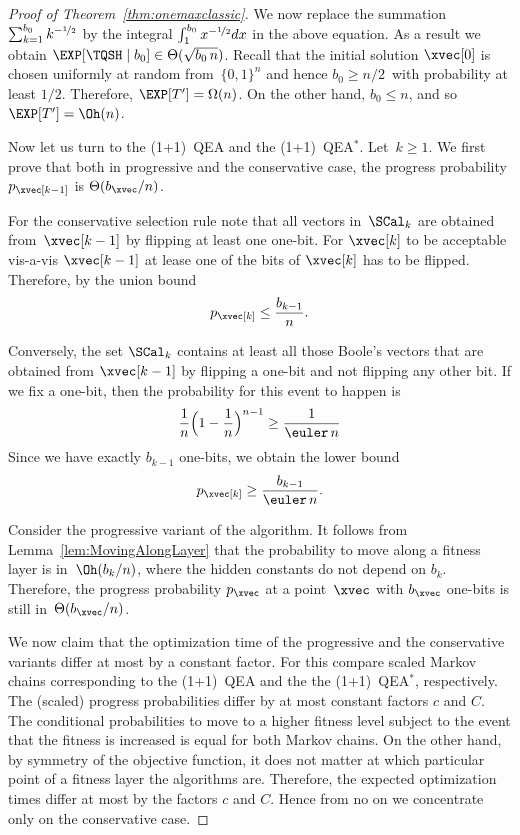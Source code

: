 \begin{proof}[Proof of Theorem~\ref{thm:onemaxclassic}]
  We now replace the summation $\sum_{k=1}^{b_0}k^{-\nicefrac{1}{2}}$
  by the integral $\int_1^{b_0}x^{-\nicefrac{1}{2}}dx$ in the above
  equation. As a result we obtain $\EXP[\TQSH\mid
  b_0]\in\Theta(\sqrt{b_0\,n})$.  Recall that the initial solution
  $\xvec[0]$ is chosen uniformly at random from~$\{0,1\}^n$ and hence
  $b_0\geq n/2$~with probability at least $1/2$. Therefore, $\EXP[T']
  = \Omega(n)$. On the other hand, $b_0 \le n$, and so $\EXP[T'] =
  \Oh(n)$.


  Now let us turn to the (1+1)~QEA and the (1+1)~QEA$^*$. Let~$k\ge
  1$. We first prove that both in progressive and the conservative
  case, the progress probability $p_{\xvec[k-1]}$ is
  $\Theta(b_{\xvec}/n)$.

  For the conservative selection rule note that all vectors
  in~$\SCal_k$ are obtained from~$\xvec[k-1]$ by flipping at least one
  one-bit. For $\xvec[k]$ to be acceptable vis-a-vis $\xvec[k-1]$ at
  lease one of the bits of $\xvec[k]$ has to be flipped. Therefore, by
  the union bound
  \[ p_{\xvec[k]}\le\frac{ b_{k-1}}{n}.\]

  Conversely, the set $\SCal_k$ contains at least all those Boole's
  vectors that are obtained from $\xvec[k-1]$ by flipping a one-bit
  and not flipping any other bit. If we fix a one-bit, then the
  probability for this event to happen is
  \[
  \frac{1}{n}\Big(1-\frac{1}{n}\Big)^{n-1} \geq \frac{1}{\euler\,n}
  \]
  Since we have exactly $b_{k-1}$ one-bits, we obtain the lower bound
  \[
  p_{\xvec[k]}\ge\frac{b_{k-1}}{\euler\,n}.
  \]
  
  Consider the progressive variant of the algorithm. It follows from
  Lemma~\ref{lem:MovingAlongLayer} that the probability to move along
  a fitness layer is in~$\Oh(b_k/n)$, where the hidden constants do
  not depend on $b_k$. Therefore, the progress probability $p_{\xvec}$
  at a point~$\xvec$ with $b_{\xvec}$ one-bits is still
  in~$\Theta(b_{\xvec}/n)$. 


  We now claim that the optimization time of the progressive and the
  conservative variants differ at most by a constant factor. For this
  compare scaled Markov chains corresponding to the (1+1)~QEA and the
  the (1+1)~QEA$^*$, respectively. The (scaled) progress probabilities
  differ by at most constant factors $c$ and $C$. The conditional
  probabilities to move to a higher fitness level subject to the event
  that the fitness is increased is equal for both Markov chains. On
  the other hand, by symmetry of the objective function, it does not
  matter at which particular point of a fitness layer the algorithms
  are. Therefore, the expected optimization times differ at most by
  the factors $c$ and $C$. Hence from no on we concentrate only on the
  conservative case.



\end{proof}
